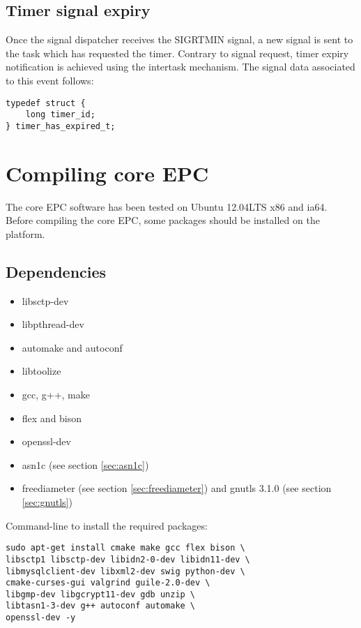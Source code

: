 \documentclass[a4paper,oneside]{report}
\begin{document}
\section{Timer signal expiry}

Once the signal dispatcher receives the SIGRTMIN signal, a new signal is sent
to the task which has requested the timer. Contrary to signal request, timer
expiry notification is achieved using the intertask mechanism.
The signal data associated to this event follows:
\begin{lstlisting}
typedef struct {
    long timer_id;
} timer_has_expired_t;
\end{lstlisting}

\chapter*{Compiling core EPC} 

The core EPC software has been tested on Ubuntu 12.04LTS x86 and ia64.
Before compiling the core EPC, some packages should be installed on the platform.

\section{Dependencies}

\begin{itemize}
 \item libsctp-dev
 \item libpthread-dev
 \item automake and autoconf
 \item libtoolize
 \item gcc, g++, make
 \item flex and bison
 \item openssl-dev
 \item asn1c (see section \ref{sec:asn1c})
 \item freediameter (see section \ref{sec:freediameter}) and gnutls 3.1.0
 (see section \ref{sec:gnutls})
\end{itemize}
Command-line to install the required packages:
\begin{lstlisting}
sudo apt-get install cmake make gcc flex bison \
libsctp1 libsctp-dev libidn2-0-dev libidn11-dev \
libmysqlclient-dev libxml2-dev swig python-dev \
cmake-curses-gui valgrind guile-2.0-dev \
libgmp-dev libgcrypt11-dev gdb unzip \
libtasn1-3-dev g++ autoconf automake \
openssl-dev -y
\end{lstlisting}
\end{document}
